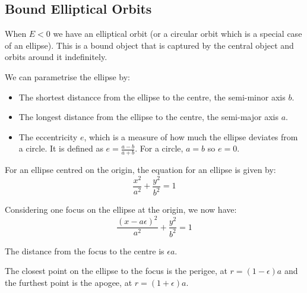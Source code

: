 \subsection{Bound Elliptical Orbits}
When $E<0$ we have an elliptical orbit (or a circular orbit which is a special case of an ellipse). This is a bound object that is captured by the central object and orbits around it indefinitely.

We can parametrise the ellipse by:
\begin{itemize}
    \item The shortest distancce from the ellipse to the centre, the semi-minor axis $b$.
    \item The longest distance from the ellipse to the centre, the semi-major axis $a$.
    \item The eccentricity $e$, which is a measure of how much the ellipse deviates from a circle. It is defined as $e = \frac{a - b}{a + b}$. For a circle, $a = b$ so $e = 0$. 
\end{itemize}

For an ellipse centred on the origin, the equation for an ellipse is given by:
\[
    \frac{x^2}{a^2} + \frac{y^2}{b^2} = 1
\]

Considering one focus on the ellipse at the origin, we now have:
\[
    \frac{(x - a \epsilon)^2}{a^2} + \frac{y^2}{b^2} = 1
\]

The distance from the focus to the centre is $\epsilon a$.

The closest point on the ellipse to the focus is the perigee, at $r = (1 - \epsilon)a$ and the furthest point is the apogee, at $r = (1 + \epsilon)a$.

